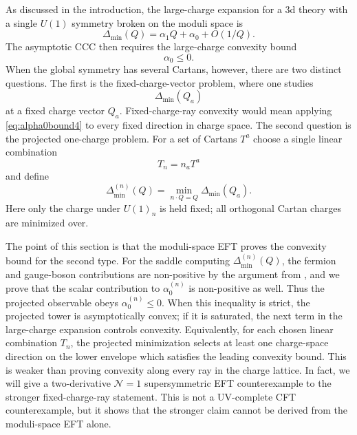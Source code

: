 \documentclass[a4paper,11pt]{article}
\newcommand\Dm{\Delta_{\min}}
\begin{document}
As discussed in the introduction, the large-charge expansion for a 3d theory with a single $U(1)$ symmetry broken on the moduli space is
\begin{equation}
  \Dm(Q)=\alpha_1 Q + \alpha_0 + O(1/Q).
\end{equation}
The asymptotic CCC then requires the large-charge convexity bound
\begin{equation}\label{eq:alpha0bound4}
  \alpha_0\leq 0.
\end{equation}
When the global symmetry has several Cartans, however, there are two distinct questions. The first is the fixed-charge-vector problem, where one studies
\begin{equation}
  \Delta_{\min}(Q_a)
\end{equation}
at a fixed charge vector $Q_a$. Fixed-charge-ray convexity would mean applying \eqref{eq:alpha0bound4} to every fixed direction in charge space. The second question is the projected one-charge problem. For a set of Cartans $T^a$ choose a single linear combination
\begin{equation}
  T_n=n_aT^a
\end{equation}
and define
\begin{equation}
  \Delta_{\min}^{(n)}(Q) = \min_{n\cdot Q=Q}\Delta_{\min}(Q_a). \label{eq:projected-one-charge-observable}
\end{equation}
Here only the charge under $U(1)_n$ is held fixed; all orthogonal Cartan charges are minimized over.

The point of this section is that the moduli-space EFT proves the convexity bound for the second type. For the saddle computing $\Delta_{\min}^{(n)}(Q)$, the fermion and gauge-boson contributions are non-positive by the argument from \cite{Cuomo:2024fuy}, and we prove that the scalar contribution to $\alpha_0^{(n)}$ is non-positive as well. Thus the projected observable obeys $\alpha_0^{(n)}\leq0$. When this inequality is strict, the projected tower is asymptotically convex; if it is saturated, the next term in the large-charge expansion controls convexity. Equivalently, for each chosen linear combination $T_n$, the projected minimization selects at least one
charge-space direction on the lower envelope which satisfies the leading convexity bound. This is weaker than proving convexity along every ray in the charge lattice. In fact, we will give a two-derivative $\mathcal{N}=1$ supersymmetric EFT counterexample to the stronger fixed-charge-ray statement. This is not a UV-complete CFT counterexample, but it shows that the stronger claim cannot be derived from the moduli-space EFT alone.
\end{document}
